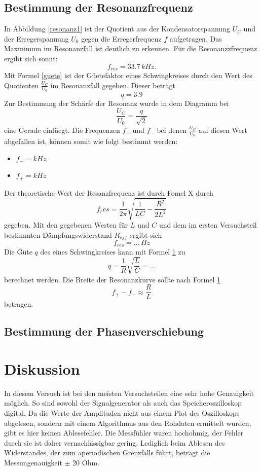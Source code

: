 \documentclass[11pt,ngerman,a4paper]{article}
\begin{document}
\subsection{Bestimmung der Resonanzfrequenz}
In Abbildung \ref{resonanz1} ist der Quotient aus der Kondensatorspannung $U_C$ und der Erregerspannung $U_0$ gegen die Erregerfrequenz $f$ aufgetragen. Das Maxmimum im Resonanzfall ist deutlich zu erkennen. F\"ur die Resonanzzfrequenz ergibt sich somit:
\[
	f_{res} = 33.7\,kHz.
\]
Mit Formel \ref{guete} ist der G\"uetefaktor eines Schwingkreises durch den Wert des Quotienten $\frac{U_C}{U_0}$ im Resonanzfall gegeben. Dieser betr\"agt
\[
q =  3.9
\]
Zur Bestimmung der Sch\"arfe der Resonanz wurde in dem Diagramm bei 
\[
\frac{U_C}{U_0} = \frac{q}{\sqrt{2}}
\]
eine Gerade einf\"uegt. Die Frequenzen $f_+$ und $f_-$ bei denen $\frac{U_C}{U_0}$ auf diesen Wert abgefallen ist, k\"onnen somit wie folgt bestimmt werden:
\begin{itemize}
\item $f_- = kHz$
\item $f_+ = kHz$
\end{itemize}

\noindent
Der theoretische Wert der Resanzfrequenz ist durch Fomel X durch
\[
f_res = \frac1{2\pi} \sqrt{\frac{1}{LC}-\frac{R^2}{2L^2}}
\]
gegeben. Mit den gegebenen Werten f\"ur $L$ und $C$ und dem im ersten Versuchsteil bestimmten D\"ampfungswiderstand
$R_{eff}$ ergibt sich 
\[
f_{res} = ...\,Hz
\]
Die G\"ute $q$ des eines Schwingkreises kann mit Formel \ref{} zu
\[
q = \frac{1}{R} \sqrt{\frac{L}{C}} = ... 
\]
berechnet werden. Die Breite der Resonanzkurve sollte nach Formel \ref{}
\[
f_+ - f_- \approx \frac{R}{L}
\]
betragen.
\subsection{Bestimmung der Phasenverschiebung}
\section{Diskussion}
In diesem Versuch ist bei den meisten Versuchsteilen eine sehr hohe Genauigkeit möglich. So sind sowohl der Signalgenerator als auch das Speicheroszilloskop digital. Da die Werte der Amplituden nicht aus einem Plot des Oszilloskops abgelesen, sondern mit einem Algorithmus aus den Rohdaten ermittelt wurden, gibt es hier keinen Ablesefehler. Die Messfühler waren hochohmig, der Fehler durch sie ist daher vernachlässigbar gering. Lediglich beim Ablesen des Widerstandes, der zum aperiodischen Grenzfalls führt, beträgt die Messungenauigkeit $\pm$ 20 Ohm.
\end{document}
